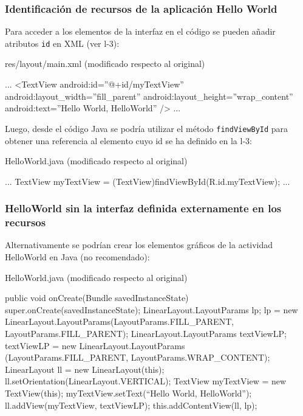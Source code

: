 \documentclass[hyperref={pdfpagelabels=true},utf8x]{beamer}
\begin{document}
\begin{frame}[fragile]
\frametitle{Identificación de recursos de la aplicación Hello World}

Para acceder a los elementos de la interfaz en el código se pueden añadir atributos \verb|id| en XML (ver l-3):


\begin{tiny}
\begin{block}{res/layout/main.xml (modificado respecto al original)}
\begin{xml}
...
<TextView  
  android:id=''@+id/myTextView''
  android:layout_width=''fill_parent''
  android:layout_height=''wrap_content''
  android:text=''Hello World, HelloWorld''
/> 
...
\end{xml}
\end{block}
\end{tiny}


Luego, desde el código Java se podría utilizar el método \verb|findViewById|
para obtener una referencia al  elemento cuyo id se ha definido en la l-3:


\begin{tiny}
\begin{block}{HelloWorld.java (modificado respecto al original)}
\begin{java}
...
TextView myTextView = (TextView)findViewById(R.id.myTextView); 
...
\end{java}
\end{block}
\end{tiny}

\end{frame}



\begin{frame}[fragile,shrink=32.47]
\frametitle{HelloWorld sin la interfaz definida externamente en los recursos}

Alternativamente se podrían crear los elementos gráficos de la
actividad HelloWorld en Java (no recomendado):


\begin{block}{HelloWorld.java (modificado respecto al original)}
\begin{java}
public void onCreate(Bundle savedInstanceState) { 
  super.onCreate(savedInstanceState); 
  LinearLayout.LayoutParams lp; 
  lp = new LinearLayout.LayoutParams(LayoutParams.FILL_PARENT, 
                                     LayoutParams.FILL_PARENT); 
  LinearLayout.LayoutParams textViewLP; 
  textViewLP = new LinearLayout.LayoutParams
                           (LayoutParams.FILL_PARENT, 
                            LayoutParams.WRAP_CONTENT); 
  LinearLayout ll = new LinearLayout(this); 
  ll.setOrientation(LinearLayout.VERTICAL); 
  TextView myTextView = new TextView(this); 
  myTextView.setText(``Hello World, HelloWorld''); 
  ll.addView(myTextView, textViewLP); 
  this.addContentView(ll, lp); 
} 
\end{java}
\end{block}



\end{frame}
\end{document}

